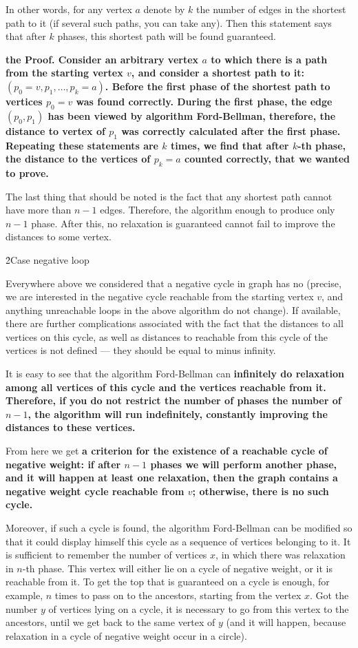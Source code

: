In other words, for any vertex $a$ denote by $k$ the number of edges in the shortest path to it (if several such paths, you can take any). Then this statement says that after $k$ phases, this shortest path will be found guaranteed. 

\bf{the Proof}. Consider an arbitrary vertex $a$ to which there is a path from the starting vertex $v$, and consider a shortest path to it: $(p_0=v, p_1, \ldots, p_k=a)$. Before the first phase of the shortest path to vertices $p_0=v$ was found correctly. During the first phase, the edge $(p_0,p_1)$ has been viewed by algorithm Ford-Bellman, therefore, the distance to vertex of $p_1$ was correctly calculated after the first phase. Repeating these statements are $k$ times, we find that after $k$-th phase, the distance to the vertices of $p_k=a$ counted correctly, that we wanted to prove.

The last thing that should be noted is the fact that any shortest path cannot have more than $n-1$ edges. Therefore, the algorithm enough to produce only $n-1$ phase. After this, no relaxation is guaranteed cannot fail to improve the distances to some vertex.


\h2{Case negative loop}

Everywhere above we considered that a negative cycle in graph has no (precise, we are interested in the negative cycle reachable from the starting vertex $v$, and anything unreachable loops in the above algorithm do not change). If available, there are further complications associated with the fact that the distances to all vertices on this cycle, as well as distances to reachable from this cycle of the vertices is not defined --- they should be equal to minus infinity.

It is easy to see that the algorithm Ford-Bellman can \bf{infinitely do relaxation} among all vertices of this cycle and the vertices reachable from it. Therefore, if you do not restrict the number of phases the number of $n-1$, the algorithm will run indefinitely, constantly improving the distances to these vertices.

From here we get \bf{a criterion for the existence of a reachable cycle of negative weight}: if after $n-1$ phases we will perform another phase, and it will happen at least one relaxation, then the graph contains a negative weight cycle reachable from $v$; otherwise, there is no such cycle.

Moreover, if such a cycle is found, the algorithm Ford-Bellman can be modified so that it could display himself this cycle as a sequence of vertices belonging to it. It is sufficient to remember the number of vertices $x$, in which there was relaxation in $n$-th phase. This vertex will either lie on a cycle of negative weight, or it is reachable from it. To get the top that is guaranteed on a cycle is enough, for example, $n$ times to pass on to the ancestors, starting from the vertex $x$. Got the number $y$ of vertices lying on a cycle, it is necessary to go from this vertex to the ancestors, until we get back to the same vertex of $y$ (and it will happen, because relaxation in a cycle of negative weight occur in a circle).

